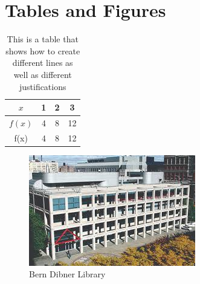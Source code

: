 \documentclass{article}
\begin{document}
\newpage
\section{Tables and Figures}
\begin{table}[H]
    \centering
    \begin{tabular}{|c||c|c|c|}
        \hline
        $x$ & 1 & 2 & 3  \\
        \hline
        $f(x)$ & 4 & 8 & 12\\
        f(x) & 4 & 8 & 12\\
        \hline
    \end{tabular}
    \caption{This is a table that shows how to create different lines as well as different justifications}
    \label{tab:my_table}
\end{table}

\begin{figure}[H]
    \centering
    \includegraphics[width=\textwidth]{bern_dibner_lib.jpeg}
    \caption{Bern Dibner Library}
    \label{fig:bern_dibner}
\end{figure}
\end{document}
